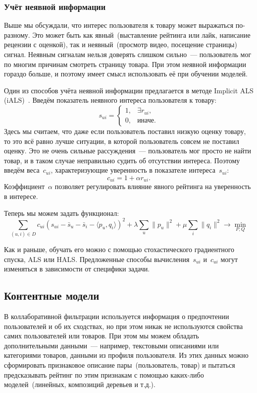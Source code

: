 \documentclass[12pt,fleqn]{article}
\begin{document}
	\subsubsection{Учёт неявной информации}
	Выше мы обсуждали, что интерес пользователя к товару может выражаться по-разному.
	Это может быть как явный~(выставление рейтинга или лайк, написание рецензии с оценкой),
	так и неявный~(просмотр видео, посещение страницы) сигнал.
	Неявным сигналам нельзя доверять слишком сильно~--- пользователь мог по многим причинам смотреть
	страницу товара.
	При этом неявной информации гораздо больше, и поэтому имеет смысл использовать её при обучении моделей.
	
	Один из способов учёта неявной информации предлагается в методе Implicit ALS (iALS)~\cite{hu08ials}.
	Введём показатель неявного интереса пользователя к товару:
	\[
	s_{ui}
	=
	\begin{cases}
	1, & \exists r_{ui},\\
	0, & \text{иначе}.
	\end{cases}
	\]
	Здесь мы считаем, что даже если пользователь поставил низкую оценку товару,
	то это всё равно лучше ситуации, в которой пользователь совсем не поставил оценку.
	Это не очень сильные рассуждения~--- пользователь мог просто не найти
	товар, и в таком случае неправильно судить об отсутствии интереса.
	Поэтому введём веса~$c_{ui}$, характеризующие уверенность в показателе интереса~$s_{ui}$:
	\[
	c_{ui}
	=
	1 + \alpha r_{ui}.
	\]
	Коэффициент~$\alpha$ позволяет регулировать влияние явного рейтинга на уверенность в интересе.
	
	Теперь мы можем задать функционал:
	\[
	\sum_{(u, i) \in D}
	c_{ui} \left(
	s_{ui}
	-
	\bar s_u
	-
	\bar s_i
	-
	\langle p_{u}, q_{i} \rangle
	\right)^{2}
	+
	\lambda
	\sum_{u}
	\|p_u\|^2
	+
	\mu
	\sum_{i}
	\|q_i\|^2
	\to
	\min_{P, Q}
	\]
	
	Как и раньше, обучать его можно с помощью стохастического градиентного спуска, ALS или HALS.
	Предложенные способы вычисления~$s_{ui}$ и~$c_{ui}$ могут изменяться в зависимости от специфики задачи.
	
	\subsection{Контентные модели}
	В коллаборативной фильтрации используется информация о предпочтении пользователей и об их сходствах,
	но при этом никак не используются свойства самих пользователей или товаров.
	При этом мы можем обладать дополнительными данными~--- например, текстовыми описаниями или категориями товаров,
	данными из профиля пользователя.
	Из этих данных можно сформировать признаковое описание пары~(пользователь, товар) и
	пытаться предсказывать рейтинг по этим признакам с помощью каких-либо моделей~(линейных, композиций деревьев и т.д.).
	
\end{document}
